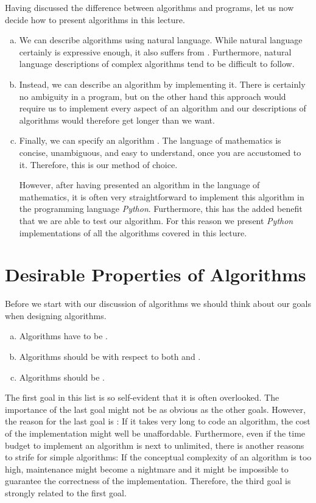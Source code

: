 Having discussed the difference between algorithms and programs, let us now decide how to present
algorithms in this lecture.  
\begin{enumerate}[(a)]
\item We can describe algorithms using natural language.  While natural language certainly is
      expressive enough, it also suffers from .  Furthermore, natural language
      descriptions of complex algorithms tend to be difficult to follow.
\item Instead, we can describe an algorithm by implementing it.  There is certainly no ambiguity
      in a program, but on the other hand this approach would require us to implement every aspect
      of an  algorithm and our descriptions of algorithms would therefore get longer than we want.
\item Finally, we can specify an algorithm .  The language of mathematics is 
      concise, unambiguous, and easy to understand, once you are accustomed to it.  Therefore, this is
      our method of choice.

      However, after having presented an algorithm in the language of mathematics, it is often very
      straightforward to implement this algorithm in the programming language \textsl{Python}.
      Furthermore, this has the added benefit that we are able to test our algorithm.  For this reason we
      present \textsl{Python} implementations of all the algorithms covered in this lecture.
\end{enumerate}

\section{Desirable Properties of Algorithms}
Before we start with our discussion of algorithms we should think about our goals when designing
algorithms.  
\begin{enumerate}[(a)]
\item Algorithms have to be .
\item Algorithms should be  with respect to both  and .
\item Algorithms should be .
\end{enumerate}
The first goal in this list is so self-evident that it is often overlooked.  The
importance of the last goal might not be as obvious as the other goals.
However, the reason for the last goal is :  If it takes very long to code an algorithm, the
cost of the implementation might well be unaffordable.  Furthermore, even if the time budget to implement an
algorithm is next to unlimited,  there is another reasons to strife for simple algorithms:  If the conceptual
complexity of an algorithm is too high, maintenance might become a nightmare and it might be impossible to
guarantee the correctness of the implementation.  Therefore, the third goal is strongly related to the first goal.  


